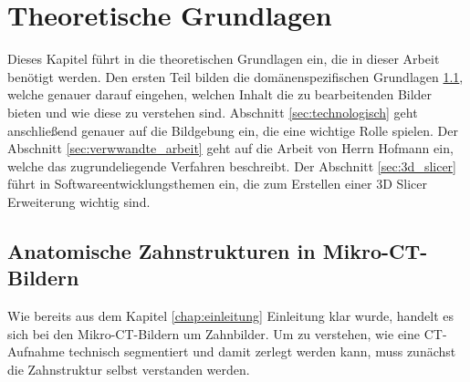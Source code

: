\chapter{Theoretische Grundlagen}
\label{chap:theoretische_grundlagen} Dieses Kapitel führt in die theoretischen Grundlagen
ein, die in dieser Arbeit benötigt werden. Den ersten Teil bilden die domänenspezifischen
Grundlagen \ref{sec:domänenspezifisch}, welche genauer darauf eingehen, welchen Inhalt
die zu bearbeitenden Bilder bieten und wie diese zu verstehen sind. Abschnitt
\ref{sec:technologisch} geht anschließend genauer auf die Bildgebung ein, die eine
wichtige Rolle spielen. Der Abschnitt \ref{sec:verwwandte_arbeit} geht auf die
Arbeit von Herrn Hofmann ein, welche das zugrundeliegende Verfahren beschreibt.
Der Abschnitt \ref{sec:3d_slicer} führt in Softwareentwicklungsthemen ein, die zum
Erstellen einer 3D Slicer Erweiterung wichtig sind.

\section{Anatomische Zahnstrukturen in Mikro-CT-Bildern}
\label{sec:domänenspezifisch} Wie bereits aus dem Kapitel \ref{chap:einleitung} Einleitung
klar wurde, handelt es sich bei den Mikro-\ac{CT}-Bildern um Zahnbilder. Um zu
verstehen, wie eine \ac{CT}-Aufnahme technisch segmentiert und damit zerlegt
werden kann, muss zunächst die Zahnstruktur selbst verstanden werden.

